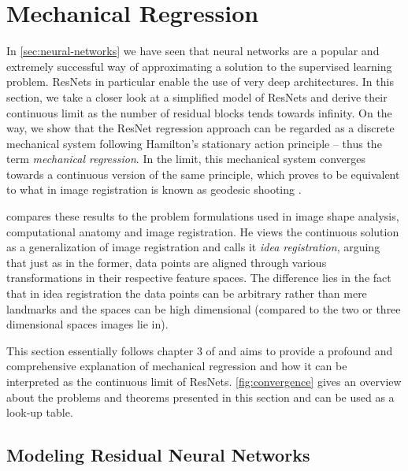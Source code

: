 \section{Mechanical Regression}
\label{sec:mechanical-regression}

In \cref{sec:neural-networks} we have seen that neural networks are a popular and extremely successful way of approximating a solution to the supervised learning problem.
ResNets in particular enable the use of very deep architectures.
In this section, we take a closer look at a simplified model of ResNets and derive their continuous limit as the number of residual blocks tends towards infinity.
On the way, we show that the ResNet regression approach can be regarded as a discrete mechanical system following Hamilton's stationary action principle -- thus the term \emph{mechanical regression}.
In the limit, this mechanical system converges towards a continuous version of the same principle, which proves to be equivalent to what in image registration is known as geodesic shooting \cite{allassonniere05}.

\citet{owhadi20} compares these results to the problem formulations used in image shape analysis, computational anatomy and image registration.
He views the continuous solution as a generalization of image registration and calls it \emph{idea registration}, arguing that just as in the former, data points are aligned through various transformations in their respective feature spaces.
The difference lies in the fact that in idea registration the data points can be arbitrary rather than mere landmarks and the spaces can be high dimensional (compared to the two or three dimensional spaces images lie in).

This section essentially follows chapter 3 of \cite{owhadi20} and aims to provide a profound and comprehensive explanation of mechanical regression and how it can be interpreted as the continuous limit of ResNets.
\cref{fig:convergence} gives an overview about the problems and theorems presented in this section and can be used as a look-up table.

\subsection{Modeling Residual Neural Networks}
\label{sec:resnet-model}

